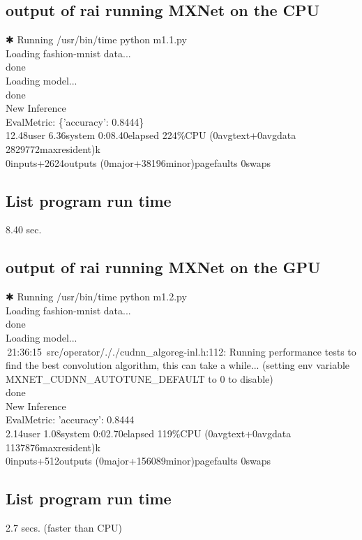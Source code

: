 \documentclass[12pt]{article}
\begin{document}
\subsection{output of rai running MXNet on the CPU}
✱ Running /usr/bin/time python m1.1.py\\
Loading fashion-mnist data...\\
done\\
Loading model...\\
done\\
New Inference\\
EvalMetric: \{'accuracy': 0.8444\}\\
12.48user 6.36system 0:08.40elapsed 224\%CPU (0avgtext+0avgdata 2829772maxresident)k\\
0inputs+2624outputs (0major+38196minor)pagefaults 0swaps\\

\subsection{List program run time}
8.40 sec.

\subsection{output of rai running MXNet on the GPU}
✱ Running /usr/bin/time python m1.2.py\\
Loading fashion-mnist data...\\
done\\
Loading model...\\
\,21:36:15\, src/operator/././cudnn\_algoreg-inl.h:112: Running performance tests to find the best convolution algorithm, this can take a while... (setting env variable MXNET\_CUDNN\_AUTOTUNE\_DEFAULT to 0 to disable)\\
done\\
New Inference\\
EvalMetric: {'accuracy': 0.8444}\\
2.14user 1.08system 0:02.70elapsed 119\%CPU (0avgtext+0avgdata 1137876maxresident)k\\
0inputs+512outputs (0major+156089minor)pagefaults 0swaps\\

\subsection{List program run time}
2.7 secs. (faster than CPU)
\end{document}
